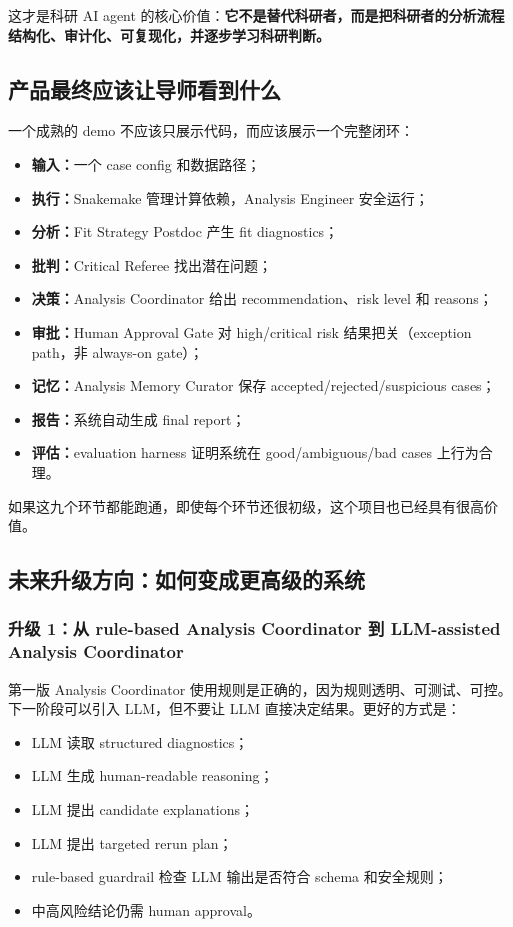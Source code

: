 \documentclass[11pt,a4paper,fontset=none]{ctexart}
\begin{document}
这才是科研 AI agent 的核心价值：\textbf{它不是替代科研者，而是把科研者的分析流程结构化、审计化、可复现化，并逐步学习科研判断。}

\subsection{产品最终应该让导师看到什么}

一个成熟的 demo 不应该只展示代码，而应该展示一个完整闭环：

\begin{itemize}[leftmargin=2em]
  \item \textbf{输入：}一个 case config 和数据路径；
  \item \textbf{执行：}Snakemake 管理计算依赖，Analysis Engineer 安全运行；
  \item \textbf{分析：}Fit Strategy Postdoc 产生 fit diagnostics；
  \item \textbf{批判：}Critical Referee 找出潜在问题；
  \item \textbf{决策：}Analysis Coordinator 给出 recommendation、risk level 和 reasons；
  \item \textbf{审批：}Human Approval Gate 对 high/critical risk 结果把关（exception path，非 always-on gate）；
  \item \textbf{记忆：}Analysis Memory Curator 保存 accepted/rejected/suspicious cases；
  \item \textbf{报告：}系统自动生成 final report；
  \item \textbf{评估：}evaluation harness 证明系统在 good/ambiguous/bad cases 上行为合理。
\end{itemize}

如果这九个环节都能跑通，即使每个环节还很初级，这个项目也已经具有很高价值。

\subsection{未来升级方向：如何变成更高级的系统}

\subsubsection{升级 1：从 rule-based Analysis Coordinator 到 LLM-assisted Analysis Coordinator}

第一版 Analysis Coordinator 使用规则是正确的，因为规则透明、可测试、可控。下一阶段可以引入 LLM，但不要让 LLM 直接决定结果。更好的方式是：

\begin{itemize}[leftmargin=2em]
  \item LLM 读取 structured diagnostics；
  \item LLM 生成 human-readable reasoning；
  \item LLM 提出 candidate explanations；
  \item LLM 提出 targeted rerun plan；
  \item rule-based guardrail 检查 LLM 输出是否符合 schema 和安全规则；
  \item 中高风险结论仍需 human approval。
\end{itemize}
\end{document}
